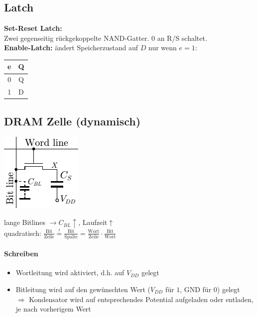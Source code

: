 \documentclass[6pt,a4paper]{scrartcl}
\renewcommand{\emph}[1]{\textsf{\textbf{#1}}}
\newcommand{\Ra}[0]{\ensuremath{\Rightarrow}}									%
\newcommand{\ra}[0]{\ensuremath{\rightarrow}} 									%
\begin{document}
\begin{multicols}{3}
	\subsection{Latch}
	\begin{multicols}{2}
	\emph{Set-Reset Latch:} \\ Zwei gegenseitig rückgekoppelte NAND-Gatter. $0$ an R/S schaltet. \\
	\emph{Enable-Latch:} ändert Speicherzustand auf $D$ nur wenn $e=1$: \begin{tabular}{c|c} e & Q \\ \hline 0 & Q \\ 1 & D \end{tabular}
	\end{multicols}
	\subsection{DRAM Zelle (dynamisch)}

	\parbox{3.0cm}{ \includegraphics{img/ds/DRAM.pdf} }
	\parbox{6.0cm}{ 
	
	lange Bitlines $\ra C_{BL} \uparrow$, Laufzeit$\uparrow$\\
	quadratisch: $\frac{\text{Bit}}{\text{Zeile}} \stackrel{!}= \frac{\text{Bit}}{\text{Spalte}} = \frac{\text{Wort}}{\text{Zeile}} \cdot \frac{\text{Bit}}{\text{Wort}}$\\
	
	\paragraph{Schreiben}
		\begin{itemize}\itemsep0pt
			\item Wortleitung wird aktiviert, d.h. auf $V_{DD}$ gelegt
			\item Bitleitung wird auf den gewünschten Wert ($V_{DD}$ für $1$, GND für $0$) gelegt \\
			$\Ra$ Kondensator wird auf entsprechendes Potential aufgeladen oder entladen, je nach vorherigem Wert
		\end{itemize}
	}
	

\end{multicols}
\end{document}
